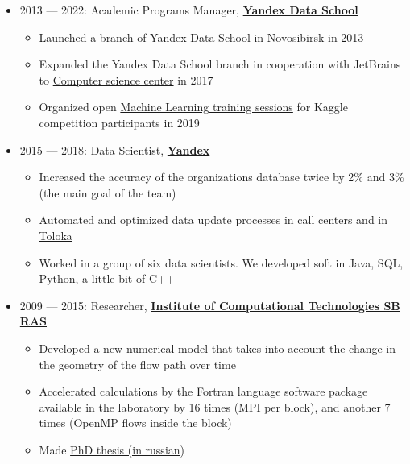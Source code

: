 \documentclass[11pt]{article}
\begin{document}
\begin{itemize}
  \item 2013 — 2022:
	Academic Programs Manager, \textbf{\href{https://academy.yandex.ru/dataschool/}{Yandex Data School}}
	\begin{itemize}
		\item Launched a branch of Yandex Data School in Novosibirsk in 2013
		\item Expanded the Yandex Data School branch in cooperation with JetBrains to \href{https://compscicenter.ru}{Computer science center} in 2017
		\item Organized open \href{https://habr.com/ru/company/JetBrains-education/blog/458042/}{Machine Learning training sessions} for Kaggle competition participants in 2019
	\end{itemize}

  \item 2015 — 2018:
	Data Scientist, \textbf{\href{https://ya.ru/}{Yandex}}
	\begin{itemize}
		\item Increased the accuracy of the organizations database twice by 2\% and 3\% (the main goal of the team)
		\item Automated and optimized data update processes in call centers and in \href{https://toloka.ai/}{Toloka}
		\item Worked in a group of six data scientists. We developed soft in Java, SQL, Python, a little bit of C++
	\end{itemize}

  \item 2009 — 2015:
	Researcher, \textbf{\href{http://www.ict.nsc.ru/en}{Institute of Computational Technologies SB RAS}}
	\begin{itemize}
		\item Developed a new numerical model that takes into account the change in the geometry of the flow path over time
		\item Accelerated calculations by the Fortran language software package available in the laboratory by 16 times (MPI per block), and another 7 times (OpenMP flows inside the block)
		\item Made \href{https://github.com/avalur/dissertation/blob/master/to_print/autoref_Avdyushenko.pdf}{PhD thesis (in russian)}
	\end{itemize}

\end{itemize}
\end{document}
